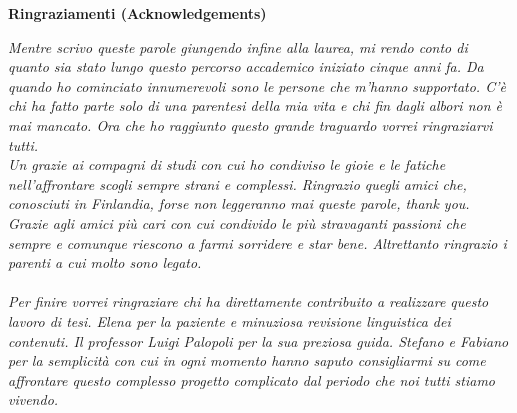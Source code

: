 \thispagestyle{empty}

\begin{center}
  {\bf \Huge Ringraziamenti (Acknowledgements)}
\end{center}
\vspace{2.5cm}
\emph{Mentre scrivo queste parole giungendo infine alla laurea, mi rendo conto di quanto sia stato lungo questo percorso accademico iniziato cinque anni fa. Da quando ho cominciato innumerevoli sono le persone che m'hanno supportato. C'è chi ha fatto parte solo di una parentesi della mia vita e chi fin dagli albori non è mai mancato. Ora che ho raggiunto questo grande traguardo vorrei ringraziarvi tutti.\\
Un grazie ai compagni di studi con cui ho condiviso le gioie e le fatiche nell'affrontare scogli sempre strani e complessi. Ringrazio quegli amici che, conosciuti in Finlandia, forse non leggeranno mai queste parole, thank you. Grazie agli amici più cari con cui condivido le più stravaganti passioni che sempre e comunque riescono a farmi sorridere e star bene. Altrettanto ringrazio i parenti a cui molto sono legato.\\
\\
Per finire vorrei ringraziare chi ha direttamente contribuito a realizzare questo lavoro di tesi. Elena per la paziente e minuziosa revisione linguistica dei contenuti. Il professor Luigi Palopoli per la sua preziosa guida. Stefano e Fabiano per la semplicità con cui in ogni momento hanno saputo consigliarmi su come affrontare questo complesso progetto complicato dal periodo che noi tutti stiamo vivendo.}
